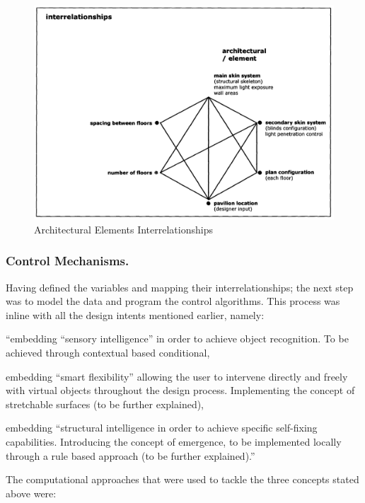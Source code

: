 \begin{figure}[htbp]
\centering
\includegraphics[width=\textwidth]{./Images/11-ArchElmLoop}
\caption[Architectural Elements Interrelationships]{Architectural Elements Interrelationships \cite{zulas04}}
\label{fig:ArchElmLoop}
\end{figure}

\subsubsection{Control Mechanisms.}

Having defined the variables and mapping their interrelationships; the next step was to model the data and program the control algorithms. This process was inline with all the design intents mentioned earlier, namely: 
\begin{inparaenum}
\item ``embedding ``sensory intelligence'' in order to achieve object recognition. To be achieved through contextual based conditional,
\item embedding ``smart flexibility'' allowing the user to intervene directly and freely with virtual objects throughout the design process. Implementing the concept of stretchable surfaces (to be further explained),
\item embedding ``structural intelligence in order to achieve specific self-fixing capabilities. Introducing the concept of emergence, to be implemented locally through a rule based approach (to be further explained).''
\end{inparaenum} \cite{zulas04}

The computational approaches that were used to tackle the three concepts stated above were: 

